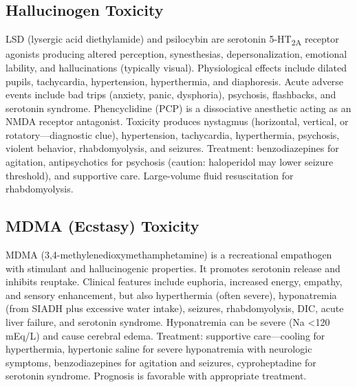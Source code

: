 \subsection{Hallucinogen Toxicity}
\label{sec:Hallucinogen Toxicity}
LSD (lysergic acid diethylamide) and psilocybin are serotonin 5-HT\textsubscript{2A} receptor agonists producing altered perception, synesthesias, depersonalization, emotional lability, and hallucinations (typically visual). Physiological effects include dilated pupils, tachycardia, hypertension, hyperthermia, and diaphoresis. Acute adverse events include bad trips (anxiety, panic, dysphoria), psychosis, flashbacks, and serotonin syndrome. Phencyclidine (PCP) is a dissociative anesthetic acting as an NMDA receptor antagonist. Toxicity produces nystagmus (horizontal, vertical, or rotatory---diagnostic clue), hypertension, tachycardia, hyperthermia, psychosis, violent behavior, rhabdomyolysis, and seizures. Treatment: benzodiazepines for agitation, antipsychotics for psychosis (caution: haloperidol may lower seizure threshold), and supportive care. Large-volume fluid resuscitation for rhabdomyolysis.

\subsection{MDMA (Ecstasy) Toxicity}
\label{sec:MDMA Toxicity}
MDMA (3,4-methylenedioxymethamphetamine) is a recreational empathogen with stimulant and hallucinogenic properties. It promotes serotonin release and inhibits reuptake. Clinical features include euphoria, increased energy, empathy, and sensory enhancement, but also hyperthermia (often severe), hyponatremia (from SIADH plus excessive water intake), seizures, rhabdomyolysis, DIC, acute liver failure, and serotonin syndrome. Hyponatremia can be severe (Na <120 mEq/L) and cause cerebral edema. Treatment: supportive care---cooling for hyperthermia, hypertonic saline for severe hyponatremia with neurologic symptoms, benzodiazepines for agitation and seizures, cyproheptadine for serotonin syndrome. Prognosis is favorable with appropriate treatment.

